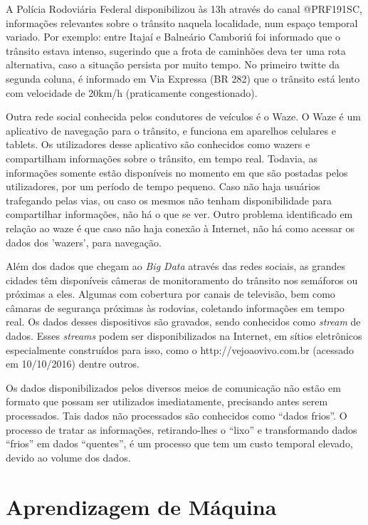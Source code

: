A Polícia Rodoviária Federal disponibilizou às 13h através do canal @PRF191SC, informações relevantes sobre o trânsito naquela localidade, 
num espaço temporal variado. Por exemplo: entre Itajaí e Balneário Camboriú foi informado que o trânsito estava intenso, sugerindo que a frota de caminhões deva ter uma rota alternativa, caso a situação persista por muito tempo. No primeiro twitte da segunda coluna, é informado em Via Expressa (BR 282) que o trânsito está lento com velocidade de 20km/h (praticamente congestionado). 


Outra rede social conhecida pelos condutores de veículos é o Waze. O Waze é um aplicativo de navegação para o trânsito, e funciona em aparelhos celulares e tablets. Os utilizadores desse aplicativo são conhecidos como wazers e compartilham informações sobre o trânsito, em tempo real. Todavia, as informações somente estão disponíveis no momento em que são postadas pelos utilizadores, por um período de tempo pequeno. Caso não haja usuários trafegando pelas vias, ou caso os mesmos não tenham disponibilidade para compartilhar informações, não há o que se ver. Outro problema identificado em relação ao waze é que caso não haja conexão à Internet, não há como acessar os dados dos 'wazers', para navegação.

Além dos dados que chegam ao \textit{Big Data} através das redes sociais, as grandes cidades têm disponíveis câmeras de monitoramento do trânsito nos semáforos ou próximas a eles. Algumas com cobertura por canais de televisão, bem como câmaras de segurança próximas às rodovias, coletando informações em tempo real. Os dados desses dispositivos são gravados, sendo conhecidos como \textit{stream} de dados. Esses \textit{streams} podem ser disponibilizados na Internet, em sítios eletrônicos especialmente construídos para isso, como o http://vejoaovivo.com.br (acessado em 10/10/2016) dentre outros.

Os dados disponibilizados pelos diversos meios de comunicação não estão em formato que possam ser utilizados imediatamente, precisando antes serem processados. Tais dados não processados são conhecidos como ``dados frios''. O processo de tratar as informações, retirando-lhes o ``lixo'' e transformando dados ``frios'' em dados ``quentes'', é um processo que tem um custo temporal elevado, devido ao volume dos dados.


\section{Aprendizagem de Máquina} \label{arte:palavraChave:Machine}

